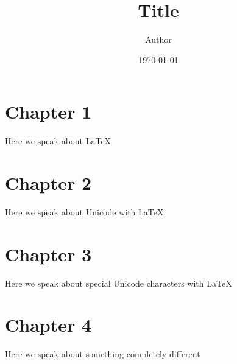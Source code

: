 \documentclass[10pt]{report}
\title{Title}
\author{Author}
\date{\today}
\begin{document}
\maketitle

\chapter{Chapter 1}
\label{sec:chapter-1}

Here we speak about \LaTeX {}

\chapter{Chapter 2}
\label{sec:chapter-2}

Here we speak about Unicode with \LaTeX {}

\chapter{Chapter 3}
\label{sec:chapter-3}

Here we speak about special Unicode characters with \LaTeX
{}


\chapter{Chapter 4}
\label{sec:chapter-4}

Here we speak about something completely different 


\printindex
\end{document}
